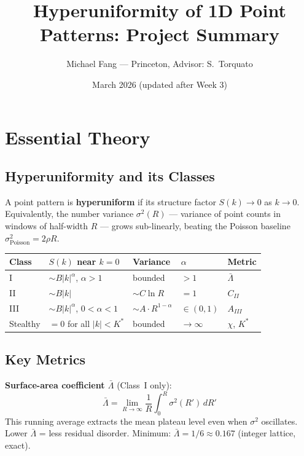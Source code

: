\documentclass[11pt,letterpaper]{article}
\title{\textbf{Hyperuniformity of 1D Point Patterns: Project Summary}}
\author{Michael Fang --- Princeton, Advisor: S.\ Torquato}
\date{March 2026 (updated after Week 3)}
\begin{document}
\maketitle
\tableofcontents
\clearpage

\section{Essential Theory}

\subsection{Hyperuniformity and its Classes}

A point pattern is \textbf{hyperuniform} if its structure factor $S(k) \to 0$ as $k \to 0$.
Equivalently, the number variance $\sigma^2(R)$ --- variance of point counts in windows of
half-width $R$ --- grows sub-linearly, beating the Poisson baseline $\sigma^2_\text{Poisson} = 2\rho R$.

\medskip
\begin{tabular}{lllll}
\toprule
\textbf{Class} & \textbf{$S(k)$ near $k=0$} & \textbf{Variance} & \textbf{$\alpha$} & \textbf{Metric} \\
\midrule
I        & $\sim B|k|^\alpha$, $\alpha > 1$ & bounded             & $>1$      & $\bar\Lambda$ \\
II       & $\sim B|k|$                       & $\sim C\ln R$        & $=1$      & $C_{II}$ \\
III      & $\sim B|k|^\alpha$, $0<\alpha<1$  & $\sim A\cdot R^{1-\alpha}$ & $\in(0,1)$& $A_{III}$ \\
Stealthy & $= 0$ for all $|k| < K^*$        & bounded             & $\to\infty$ & $\chi$, $K^*$ \\
\bottomrule
\end{tabular}

\subsection{Key Metrics}

\textbf{Surface-area coefficient $\bar\Lambda$} (Class~I only):
\[
\bar{\Lambda} = \lim_{R\to\infty} \frac{1}{R}\int_0^R \sigma^2(R')\,dR'
\]
This running average extracts the mean plateau level even when $\sigma^2$ oscillates.
Lower $\bar{\Lambda}$ = less residual disorder. Minimum: $\bar{\Lambda} = 1/6 \approx 0.167$ (integer lattice, exact).
\end{document}
